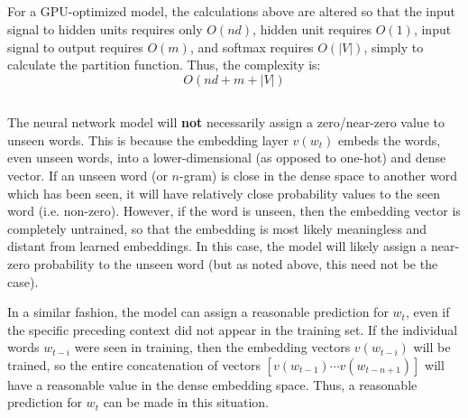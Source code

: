 \documentclass[psamsfonts]{amsart}
\theoremstyle{definition}
\theoremstyle{remark}
\numberwithin{equation}{section}
\begin{document}
\subsection{} For a GPU-optimized model, the calculations above are altered so that the input signal to hidden units requires only $O(nd)$, hidden unit requires $O(1)$, input signal to output requires $O(m)$, and softmax requires $O(|V|)$, simply to calculate the partition function. Thus, the complexity is:
$$O(nd + m + |V|)$$

\subsection{}

\subsection{}

\subsection{} The neural network model will {\bf not} necessarily assign a zero/near-zero value to unseen words. This is because the embedding layer $v(w_{t})$ embeds the words, even unseen words, into a lower-dimensional (as opposed to one-hot) and dense vector. If an unseen word (or $n$-gram) is close in the dense space to another word which has been seen, it will have relatively close probability values to the seen word (i.e. non-zero). However, if the word is unseen, then the embedding vector is completely untrained, so that the embedding is most likely meaningless and distant from learned embeddings. In this case, the model will likely assign a near-zero probability to the unseen word (but as noted above, this need not be the case).

In a similar fashion, the model can assign a reasonable prediction for $w_t$, even if the specific preceding context did not appear in the training set. If the individual words $w_{t-i}$ were seen in training, then the embedding vectors $v(w_{t-i})$ will be trained, so the entire concatenation of vectors $[v(w_{t-1}) \cdots v(w_{t-n+1})]$ will have a reasonable value in the dense embedding space. Thus, a reasonable prediction for $w_t$ can be made in this situation.

\subsection{}
\end{document}
